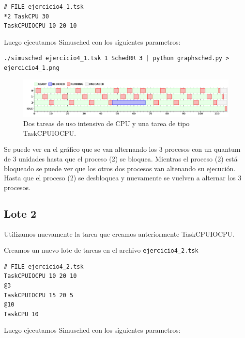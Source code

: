 \begin{framed}
\begin{verbatim}
# FILE ejercicio4_1.tsk
*2 TaskCPU 30
TaskCPUIOCPU 10 20 10
\end{verbatim}
\end{framed}

Luego ejecutamos Simusched con los siguientes parametros:

\begin{framed}
\begin{verbatim}
./simusched ejercicio4_1.tsk 1 SchedRR 3 | python graphsched.py > ejercicio4_1.png
\end{verbatim}
\end{framed}

\begin{figure}[h!]
  \caption{Dos tareas de uso intensivo de CPU y una tarea de tipo TaskCPUIOCPU.}
  \centering
    \includegraphics[width=1\textwidth]{img/ejercicio4_1.png}
\end{figure}

Se puede ver en el gr\'afico que se van alternando los 3 procesos con un quantum de 3 unidades hasta que el proceso (2) se bloquea. Mientras el proceso (2) est\'a bloqueado se puede ver que los otros dos procesos van altenando su ejecuci\'on. Hasta que el proceso (2) se desbloquea y nuevamente se vuelven a alternar los 3 procesos.

\subsection{Lote 2}

Utilizamos nuevamente la tarea que creamos anteriormente TaskCPUIOCPU.

Creamos un nuevo lote de tareas en el archivo \verb|ejercicio4_2.tsk|

\begin{framed}
\begin{verbatim}
# FILE ejercicio4_2.tsk
TaskCPUIOCPU 10 20 10
@3
TaskCPUIOCPU 15 20 5
@10
TaskCPU 10
\end{verbatim}
\end{framed}

Luego ejecutamos Simusched con los siguientes parametros:

